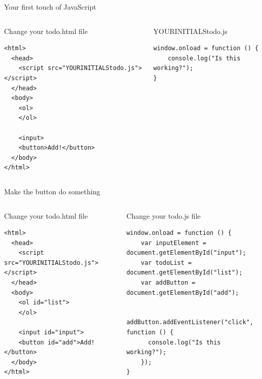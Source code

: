 \documentclass[notes]{beamer}
\begin{document}
\begin{frame}[fragile]{Your first touch of JavaScript}
  \begin{columns}
    \begin{column}{0.45\columnwidth}
      \begin{block}{Change your todo.html file}
        \begin{verbatim}
<html>
  <head>
    <script src="YOURINITIALStodo.js"></script>
  </head>
  <body>
    <ol>
    </ol>

    <input>
    <button>Add!</button>
  </body>
</html>
        \end{verbatim}
      \end{block}
    \end{column}
    \begin{column}{0.45\columnwidth}
      \begin{block}{YOURINITIALStodo.js}
        \begin{verbatim}
window.onload = function () {
    console.log("Is this working?");
}          
        \end{verbatim}
      \end{block}
    \end{column}
  \end{columns}
\end{frame}

\begin{frame}[fragile]{Make the button do something}
  \begin{columns}
    \begin{column}{0.45\columnwidth}
      \begin{block}{Change your todo.html file}
        \begin{verbatim}
<html>
  <head>
    <script src="YOURINITIALStodo.js"></script>
  </head>
  <body>
    <ol id="list">
    </ol>

    <input id="input">
    <button id="add">Add!</button>
  </body>
</html>
        \end{verbatim}
      \end{block}
    \end{column}
    \begin{column}{0.50\columnwidth}
      \begin{block}{Change your todo.js file}
        \begin{verbatim}
window.onload = function () {
    var inputElement = document.getElementById("input");
    var todoList = document.getElementById("list");
    var addButton = document.getElementById("add");

    addButton.addEventListener("click", function () {
      console.log("Is this working?");
    });
}        
        \end{verbatim}
      \end{block}
    \end{column}
  \end{columns}
\end{frame}
\end{document}
